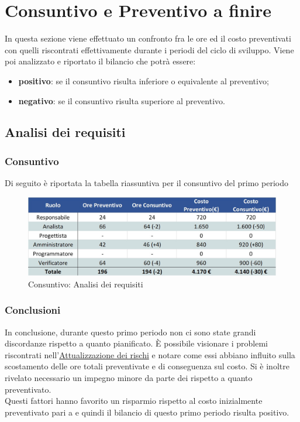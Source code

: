 \newpage
\section{Consuntivo e Preventivo a finire}

In questa sezione viene effettuato un confronto fra le ore ed il costo preventivati con quelli riscontrati effettivamente durante i periodi del ciclo di sviluppo.
Viene poi analizzato e riportato il bilancio che potrà essere:
\begin{itemize}
	\item \textbf{positivo}: se il consuntivo risulta inferiore o equivalente al preventivo;
	\item \textbf{negativo}: se il consuntivo risulta superiore al preventivo.
\end{itemize}

\subsection{Analisi dei requisiti}
\subsubsection{Consuntivo}
Di seguito è riportata la tabella riassuntiva per il consuntivo del primo periodo
\begin{figure}[h!]
	\centerline{\includegraphics[scale=0.55]{img/Preventivo/AnalisiRequisitiConsuntivo.jpg}}
	\caption{Consuntivo: Analisi dei requisiti}
\end{figure}

\subsubsection{Conclusioni}
In conclusione, durante questo primo periodo non ci sono state grandi discordanze rispetto a quanto pianificato. È possibile visionare i problemi riscontrati nell'\hyperref[RiscontroRischi]{Attualizzazione dei rischi} e notare come essi abbiano influito sulla scostamento delle ore totali preventivate e di conseguenza sul costo. Si è inoltre rivelato necessario un impegno minore da parte dei \vers{} rispetto a quanto preventivato.\\
Questi fattori hanno favorito un risparmio rispetto al costo inizialmente preventivato pari a  e quindi il bilancio di questo primo periodo risulta positivo.
